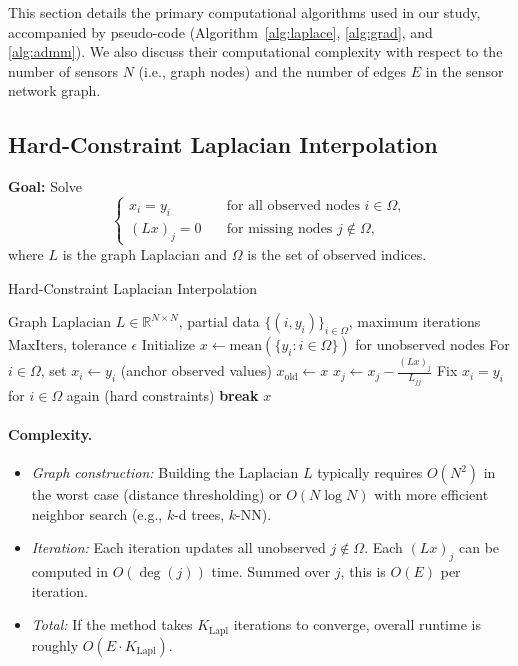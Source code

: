 \documentclass[12pt]{article}                                %
\begin{document}
This section details the primary computational algorithms used in our study, accompanied by pseudo-code (Algorithm~\ref{alg:laplace}, \ref{alg:grad}, and \ref{alg:admm}). We also discuss their computational complexity with respect to the number of sensors $N$ (i.e., graph nodes) and the number of edges $E$ in the sensor network graph.

\subsection{Hard-Constraint Laplacian Interpolation}

\noindent
\textbf{Goal:} Solve 
\[
\begin{cases}
x_i = y_i \quad & \text{for all observed nodes } i\in\Omega,\\
(Lx)_j = 0 \quad & \text{for missing nodes } j\notin\Omega,
\end{cases}
\]
where $L$ is the graph Laplacian and $\Omega$ is the set of observed indices.

\begin{algorithm}[H]
\caption{Hard-Constraint Laplacian Interpolation}
\label{alg:laplace}
\begin{algorithmic}[1]
\Require Graph Laplacian $L \in \mathbb{R}^{N\times N}$, partial data $\{(i,y_i)\}_{i\in\Omega}$, maximum iterations $\text{MaxIters}$, tolerance $\epsilon$
\State Initialize $x \gets \text{mean}(\{y_i : i\in \Omega\})$ for unobserved nodes 
\State For $i \in \Omega$, set $x_i \gets y_i$ (anchor observed values)
   \State $x_{\text{old}} \gets x$
      \State $x_j \gets x_j - \frac{(Lx)_j}{L_{jj}}$ 
   \EndFor
   \State Fix $x_i = y_i$ for $i\in \Omega$ again (hard constraints)
      \State \textbf{break}
   \EndIf
\EndFor
\State \Return $x$
\end{algorithmic}
\end{algorithm}

\paragraph{Complexity.} 
\begin{itemize}
    \item \emph{Graph construction:} Building the Laplacian $L$ typically requires $O(N^2)$ in the worst case (distance thresholding) or $O(N \log N)$ with more efficient neighbor search (e.g., $k$-d trees, $k$-NN).  
    \item \emph{Iteration:} Each iteration updates all unobserved $j\notin \Omega$. Each $(Lx)_j$ can be computed in $O(\deg(j))$ time. Summed over $j$, this is $O(E)$ per iteration.  
    \item \emph{Total:} If the method takes $K_{\mathrm{Lapl}}$ iterations to converge, overall runtime is roughly $O(E \cdot K_{\mathrm{Lapl}})$. 
\end{itemize}
\end{document}
